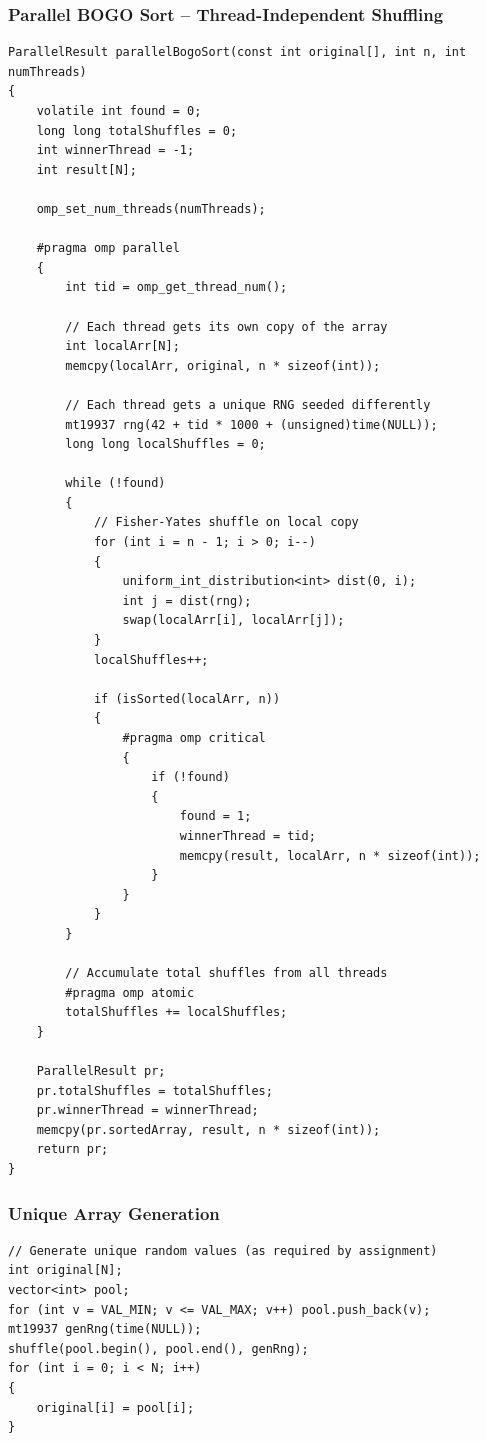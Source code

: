 \documentclass[11pt]{article}
\begin{document}
\subsubsection{Parallel BOGO Sort -- Thread-Independent Shuffling}
\begin{codebox}
\begin{lstlisting}
ParallelResult parallelBogoSort(const int original[], int n, int numThreads)
{
    volatile int found = 0;
    long long totalShuffles = 0;
    int winnerThread = -1;
    int result[N];

    omp_set_num_threads(numThreads);

    #pragma omp parallel
    {
        int tid = omp_get_thread_num();

        // Each thread gets its own copy of the array
        int localArr[N];
        memcpy(localArr, original, n * sizeof(int));

        // Each thread gets a unique RNG seeded differently
        mt19937 rng(42 + tid * 1000 + (unsigned)time(NULL));
        long long localShuffles = 0;

        while (!found)
        {
            // Fisher-Yates shuffle on local copy
            for (int i = n - 1; i > 0; i--)
            {
                uniform_int_distribution<int> dist(0, i);
                int j = dist(rng);
                swap(localArr[i], localArr[j]);
            }
            localShuffles++;

            if (isSorted(localArr, n))
            {
                #pragma omp critical
                {
                    if (!found)
                    {
                        found = 1;
                        winnerThread = tid;
                        memcpy(result, localArr, n * sizeof(int));
                    }
                }
            }
        }

        // Accumulate total shuffles from all threads
        #pragma omp atomic
        totalShuffles += localShuffles;
    }

    ParallelResult pr;
    pr.totalShuffles = totalShuffles;
    pr.winnerThread = winnerThread;
    memcpy(pr.sortedArray, result, n * sizeof(int));
    return pr;
}
\end{lstlisting}
\end{codebox}

\newpage

\subsubsection{Unique Array Generation}
\begin{codebox}
\begin{lstlisting}
// Generate unique random values (as required by assignment)
int original[N];
vector<int> pool;
for (int v = VAL_MIN; v <= VAL_MAX; v++) pool.push_back(v);
mt19937 genRng(time(NULL));
shuffle(pool.begin(), pool.end(), genRng);
for (int i = 0; i < N; i++)
{
    original[i] = pool[i];
}
\end{lstlisting}
\end{codebox}
\end{document}
